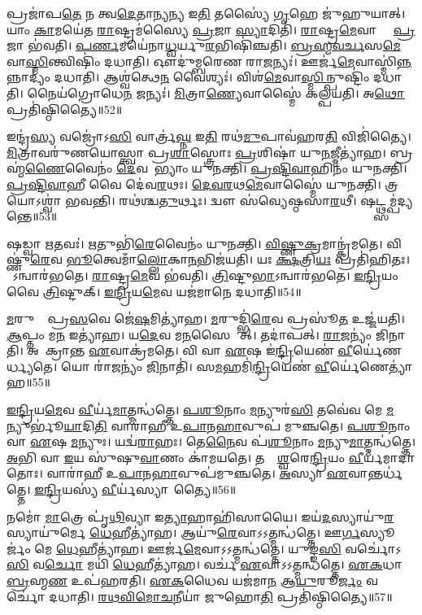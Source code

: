 𑌪𑍍𑌰𑌜𑌾॑𑌪\ul{𑌤𑍇} 𑌨 𑌤𑍍𑌵\ul{𑌦𑍇}𑌤𑌾\ul{𑌨𑍍𑌯}𑌨𑍍𑌯 𑌇\ul{𑌤𑌿} 𑌤𑌸𑍍𑌯𑍈॑ \ul{𑌗𑍃}𑌹𑍇 𑌜𑍁॑𑌹𑍁𑌯𑌾𑌤𑍍।
𑌯𑌾𑌂 \ul{𑌕𑌾}𑌮𑌯𑍇॑𑌤 \ul{𑌰𑌾}𑌷𑍍𑌟𑍍𑌰𑌮॑𑌸𑍍𑌯𑍈 \ul{𑌪𑍍𑌰}𑌜𑌾 \ul{𑌸𑍍𑌯𑌾}𑌦𑌿𑌤𑌿॑।
\ul{𑌰𑌾}𑌷𑍍𑌟𑍍𑌰\ul{𑌮𑍇}𑌵𑌾𑌸𑍍𑌯𑍈᳚ \ul{𑌪𑍍𑌰}𑌜𑌾 𑌭॑𑌵𑌤𑌿।
\ul{𑌪}\ul{𑌰𑍍𑌣}𑌮𑌯𑍇॑𑌨𑌾\ul{𑌧𑍍𑌵}𑌰𑍍𑌯𑍁\ul{𑌰}𑌭𑌿𑌷𑌿॑𑌞𑍍𑌚𑌤𑌿।
\ul{𑌬𑍍𑌰}\ul{𑌹𑍍𑌮}\ul{𑌵}\ul{𑌰𑍍𑌚}𑌸\ul{𑌮𑍇}𑌵𑌾\-\ul{𑌸𑍍𑌮𑌿}𑌨𑍍𑌤𑍍𑌵𑌿𑌷𑌿𑌂॑ 𑌦𑌧𑌾𑌤𑌿।
𑌔𑌦𑍁॑𑌮𑍍𑌬𑌰𑍇𑌣 𑌰𑌾\ul{𑌜}𑌨𑍍𑌯𑌃॑।
𑌊𑌰𑍍𑌜॑\ul{𑌮𑍇}𑌵𑌾\-𑌸𑍍𑌮𑌿॑\ul{𑌨𑍍𑌨}𑌨𑍍𑌨𑌾𑌦𑍍𑌯𑌂॑ 𑌦𑌧𑌾𑌤𑌿।
𑌆𑌶𑍍𑌵॑𑌤𑍍𑌥𑍇\ul{𑌨} 𑌵𑍈𑌶𑍍𑌯𑌃॑।
𑌵𑌿𑌶॑\ul{𑌮𑍇}𑌵𑌾\ul{𑌸𑍍𑌮𑌿}𑌨𑍍𑌪𑍁𑌷𑍍𑌟𑌿𑌂॑ 𑌦𑌧𑌾𑌤𑌿।
𑌨𑍈𑌯॑𑌗𑍍𑌰𑍋𑌧𑍇\ul{𑌨} 𑌜𑌨𑍍𑌯𑌃॑।
\ul{𑌮𑌿}𑌤𑍍𑌰𑌾\ul{𑌣𑍍𑌯𑍇}𑌵𑌾𑌸𑍍𑌮𑍈॑ 𑌕𑌲𑍍𑌪𑌯𑌤𑌿।
𑌅\ul{𑌥𑍋} 𑌪𑍍𑌰𑌤𑌿॑\-𑌷𑍍𑌠𑌿𑌤𑍍𑌯𑍈॥52॥\anuvakamend[\ul{𑌭}\ul{𑌵}\ul{𑌤𑍍𑌯𑌾}\ul{𑌹𑍁𑌃} 𑌪𑍁𑌰𑍁॑\ul{𑌷} 𑌓\ul{𑌜}𑌸𑍇𑌤𑍍𑌯𑌾॑𑌹 \ul{𑌨𑌿}𑌰𑌵॑𑌦𑌯𑌤𑍇 𑌯𑌜\ul{𑌤𑍇} 𑌜\ul{𑌨𑍍𑌯𑍋} 𑌦𑍍𑌵𑍇 𑌚॑]

𑌇𑌨𑍍𑌦𑍍𑌰॑\ul{𑌸𑍍𑌯} 𑌵𑌜𑍍𑌰𑍋॑𑌽\ul{𑌸𑌿} 𑌵𑌾𑌰𑍍𑌤𑍍𑌰॑\ul{𑌘𑍍𑌨} 𑌇\ul{𑌤𑌿} 𑌰𑌥॑\ul{𑌮𑍁}𑌪𑌾𑌵॑𑌹𑌰\ul{𑌤𑌿} 𑌵𑌿𑌜𑌿॑𑌤𑍍𑌯𑍈।
\ul{𑌮𑌿}𑌤𑍍𑌰𑌾𑌵𑌰𑍁॑𑌣𑌯𑍋𑌸𑍍𑌤𑍍𑌵𑌾 𑌪𑍍𑌰\ul{𑌶𑌾}𑌸𑍍𑌤𑍍𑌰𑍋𑌃 \ul{𑌪𑍍𑌰}𑌶𑌿𑌷𑌾॑ 𑌯𑍁\ul{𑌨}𑌜𑍍𑌮𑍀𑌤𑍍𑌯𑌾॑𑌹।
𑌬𑍍𑌰𑌹𑍍𑌮॑\ul{𑌣𑍈}𑌵𑍈𑌨𑌂॑ \ul{𑌦𑍇}𑌵𑌤𑌾᳚𑌭𑍍𑌯𑌾𑌂 𑌯𑍁𑌨𑌕𑍍𑌤𑌿।
\ul{𑌪𑍍𑌰}\ul{𑌷𑍍𑌟𑌿}\ul{𑌵𑌾}𑌹𑌿𑌨𑌂॑ 𑌯𑍁𑌨𑌕𑍍𑌤𑌿।
\ul{𑌪𑍍𑌰}\ul{𑌷𑍍𑌟𑌿}\ul{𑌵𑌾}𑌹𑍀 𑌵𑍈 𑌦𑍇॑𑌵\ul{𑌰}𑌥𑌃।
\ul{𑌦𑍇}\ul{𑌵}\ul{𑌰}𑌥\ul{𑌮𑍇}𑌵𑌾𑌸𑍍𑌮𑍈॑ 𑌯𑍁𑌨𑌕𑍍𑌤𑌿।
𑌤𑍍𑌰𑌯𑍋\-𑌽𑌶𑍍𑌵𑌾॑ 𑌭𑌵𑌨𑍍𑌤𑌿।
𑌰𑌥॑𑌶𑍍𑌚\ul{𑌤𑍁}𑌰𑍍𑌥𑌃।
𑌦𑍍𑌵𑍗 𑌸॑𑌵𑍍𑌯𑍇𑌷𑍍𑌠𑌸𑌾\ul{𑌰}𑌥𑍀।
𑌷𑌟𑍍𑌥𑍍𑌸𑌮𑍍𑌪॑𑌦𑍍𑌯𑌨𑍍𑌤𑍇॥53॥

𑌷𑌡𑍍𑌵𑌾 \ul{𑌋}𑌤𑌵𑌃॑।
\ul{𑌋}𑌤𑍁𑌭𑌿॑\ul{𑌰𑍇}𑌵𑍈𑌨𑌂॑ 𑌯𑍁𑌨𑌕𑍍𑌤𑌿।
\ul{𑌵𑌿}\ul{𑌷𑍍𑌣𑍁}\ul{𑌕𑍍𑌰}𑌮𑌾𑌨𑍍𑌕𑍍𑌰॑𑌮𑌤𑍇।
𑌵𑌿𑌷𑍍𑌣𑍁॑\ul{𑌰𑍇}𑌵 \ul{𑌭𑍂}𑌤𑍍𑌵𑍇𑌮𑌾𑌁\ul{𑌲𑍍𑌲𑍋}𑌕𑌾\ul{𑌨}𑌭𑌿𑌜॑𑌯𑌤𑌿।
𑌯𑌃 \ul{𑌕𑍍𑌷}𑌤𑍍𑌰𑌿\ul{𑌯𑌃} 𑌪𑍍𑌰𑌤𑌿॑\-𑌹𑌿𑌤𑌃।
𑌸𑍋᳚𑌽𑌨𑍍𑌵𑌾𑌰॑𑌭𑌤𑍇।
\ul{𑌰𑌾}𑌷𑍍𑌟𑍍𑌰\ul{𑌮𑍇}𑌵 𑌭॑𑌵𑌤𑌿।
\ul{𑌤𑍍𑌰𑌿}𑌷𑍍𑌟𑍁\ul{𑌭𑌾}\-𑌽𑌨𑍍𑌵𑌾𑌰॑𑌭𑌤𑍇।
\ul{𑌇}\ul{𑌨𑍍𑌦𑍍𑌰𑌿}𑌯𑌂 𑌵𑍈 \ul{𑌤𑍍𑌰𑌿}𑌷𑍍𑌟𑍁𑌕𑍍।
\ul{𑌇}\ul{𑌨𑍍𑌦𑍍𑌰𑌿}𑌯\ul{𑌮𑍇}𑌵 𑌯𑌜॑𑌮𑌾𑌨𑍇 𑌦𑌧𑌾𑌤𑌿॥54॥

\ul{𑌮}𑌰𑍁𑌤𑌾𑌂᳚ 𑌪𑍍𑌰\ul{𑌸}𑌵𑍇 𑌜𑍇॑\ul{𑌷}𑌮𑌿𑌤𑍍𑌯𑌾॑𑌹।
\ul{𑌮}𑌰𑍁𑌦𑍍𑌭𑌿॑\ul{𑌰𑍇}𑌵 𑌪𑍍𑌰𑌸𑍂॑\ul{𑌤} 𑌉𑌜𑍍𑌜॑𑌯𑌤𑌿।
\ul{𑌆}𑌪𑍍𑌤𑌂 𑌮\ul{𑌨} 𑌇𑌤𑍍𑌯𑌾॑𑌹।
𑌯\ul{𑌦𑍇}𑌵 𑌮\ul{𑌨}𑌸𑍈𑌫𑍍𑌸𑍀᳚𑌤𑍍।
𑌤𑌦𑌾॑𑌪𑌤𑍍।
\ul{𑌰𑌾}\ul{𑌜}𑌨𑍍𑌯𑌂॑ 𑌜𑌿𑌨𑌾𑌤𑌿।
𑌅𑌨𑌾᳚𑌕𑍍𑌰𑌾𑌨𑍍𑌤 \ul{𑌏}𑌵𑌾𑌕𑍍𑌰॑𑌮𑌤𑍇।
𑌵𑌿 𑌵𑌾 \ul{𑌏}𑌷 𑌇॑\ul{𑌨𑍍𑌦𑍍𑌰𑌿}𑌯𑍇𑌣॑ \ul{𑌵𑍀}𑌰𑍍𑌯𑍇॑𑌣𑌰𑍍𑌧𑍍𑌯𑌤𑍇।
𑌯𑍋 𑌰𑌾॑\ul{𑌜}𑌨𑍍𑌯𑌂॑ \ul{𑌜𑌿}𑌨𑌾𑌤𑌿॑।
𑌸\ul{𑌮}𑌹𑌮𑌿॑\ul{𑌨𑍍𑌦𑍍𑌰𑌿}𑌯𑍇𑌣॑ \ul{𑌵𑍀}𑌰𑍍𑌯𑍇॑𑌣𑍇𑌤𑍍𑌯𑌾॑𑌹॥55॥

\ul{𑌇}\ul{𑌨𑍍𑌦𑍍𑌰𑌿}𑌯\ul{𑌮𑍇}𑌵 \ul{𑌵𑍀}𑌰𑍍𑌯॑\ul{𑌮𑌾}𑌤𑍍𑌮𑌨𑍍𑌧॑𑌤𑍍𑌤𑍇।
\ul{𑌪}\ul{𑌶𑍂}𑌨𑌾𑌂 \ul{𑌮}𑌨𑍍𑌯𑍁𑌰॑\ul{𑌸𑌿} 𑌤𑌵𑍇॑𑌵 𑌮𑍇 \ul{𑌮}𑌨𑍍𑌯𑍁𑌰𑍍𑌭𑍂॑\ul{𑌯𑌾}𑌦𑌿\ul{𑌤𑌿} 𑌵𑌾𑌰𑌾॑𑌹𑍀 𑌉\ul{𑌪𑌾}𑌨\ul{𑌹𑌾}𑌵𑍁𑌪॑ 𑌮𑍁𑌞𑍍𑌚𑌤𑍇।
\ul{𑌪}\ul{𑌶𑍂}𑌨𑌾𑌂 𑌵𑌾 \ul{𑌏}𑌷 \ul{𑌮}𑌨𑍍𑌯𑍁𑌃।
𑌯𑌦𑍍𑌵॑\ul{𑌰𑌾}𑌹𑌃।
𑌤𑍇\ul{𑌨𑍈}𑌵 𑌪॑\ul{𑌶𑍂}𑌨𑌾𑌂 \ul{𑌮}𑌨𑍍𑌯𑍁\ul{𑌮𑌾}𑌤𑍍𑌮𑌨𑍍𑌧॑𑌤𑍍𑌤𑍇।
\ul{𑌅}𑌭𑌿 𑌵𑌾 \ul{𑌇}𑌯 𑌸𑍁॑𑌷𑍁\ul{𑌵𑌾}𑌣𑌂 𑌕𑌾॑𑌮𑌯𑌤𑍇।
𑌤𑌸𑍍𑌯𑍇᳚\ul{𑌶𑍍𑌵}𑌰𑍇\ul{𑌨𑍍𑌦𑍍𑌰𑌿}𑌯𑌂 \ul{𑌵𑍀}𑌰𑍍𑌯॑𑌮𑌾𑌦𑌾॑𑌤𑍋𑌃।
𑌵𑌾𑌰𑌾॑𑌹𑍀 𑌉\ul{𑌪𑌾}𑌨\ul{𑌹𑌾}𑌵𑍁𑌪॑𑌮𑍁𑌞𑍍𑌚𑌤𑍇।
\ul{𑌅}𑌸𑍍𑌯𑌾 \ul{𑌏}𑌵𑌾𑌨𑍍𑌤𑌰𑍍𑌧॑𑌤𑍍𑌤𑍇।
\ul{𑌇}\ul{𑌨𑍍𑌦𑍍𑌰𑌿}𑌯𑌸𑍍𑌯॑ \ul{𑌵𑍀}𑌰𑍍𑌯॑𑌸𑍍𑌯𑌾𑌨𑌾᳚𑌤𑍍𑌯𑍈॥56॥

𑌨𑌮𑍋॑ \ul{𑌮𑌾}𑌤𑍍𑌰𑍇 𑌪𑍃॑\ul{𑌥𑌿}𑌵𑍍𑌯𑌾 𑌇\ul{𑌤𑍍𑌯𑌾}𑌹𑌾𑌹𑌿॑𑌸𑌾𑌯𑍈।
𑌇𑌯॑\ul{𑌦}𑌸𑍍𑌯𑌾𑌯𑍁॑\ul{𑌰}𑌸𑍍𑌯𑌾𑌯𑍁॑𑌰𑍍𑌮𑍇 \ul{𑌧𑍇}𑌹𑍀𑌤𑍍𑌯𑌾॑𑌹।
𑌆𑌯𑍁॑\ul{𑌰𑍇}𑌵𑌾𑌽𑌽𑌤𑍍𑌮𑌨𑍍𑌧॑𑌤𑍍𑌤𑍇।
𑌊\ul{𑌰𑍍𑌗}𑌸𑍍𑌯𑍂𑌰𑍍𑌜𑌂॑ 𑌮𑍇 \ul{𑌧𑍇}𑌹𑍀𑌤𑍍𑌯𑌾॑𑌹।
𑌊𑌰𑍍𑌜॑\ul{𑌮𑍇}𑌵𑌾𑌽𑌽𑌤𑍍𑌮𑌨𑍍𑌧॑𑌤𑍍𑌤𑍇।
𑌯𑍁𑌙𑍍𑌙॑\ul{𑌸𑌿} 𑌵𑌰𑍍𑌚𑍋॑𑌽\ul{𑌸𑌿} 𑌵\ul{𑌰𑍍𑌚𑍋} 𑌮𑌯𑌿॑ \ul{𑌧𑍇}𑌹𑍀𑌤𑍍𑌯𑌾॑𑌹।
𑌵𑌰𑍍𑌚॑ \ul{𑌏}𑌵𑌾𑌽𑌽𑌤𑍍𑌮𑌨𑍍𑌧॑𑌤𑍍𑌤𑍇।
\ul{𑌏}\ul{𑌕}𑌧𑌾 \ul{𑌬𑍍𑌰}𑌹𑍍𑌮\ul{𑌣} 𑌉𑌪॑𑌹𑌰𑌤𑌿।
\ul{𑌏}\ul{𑌕}𑌧𑍈𑌵 𑌯𑌜॑𑌮𑌾\ul{𑌨} 𑌆\ul{𑌯𑍁}𑌰𑍂\ul{𑌰𑍍𑌜𑌂} 𑌵𑌰𑍍𑌚𑍋॑ 𑌦𑌧𑌾𑌤𑌿।
\ul{𑌰}\ul{𑌥}\ul{𑌵𑌿}\ul{𑌮𑍋}\ul{𑌚}𑌨𑍀𑌯𑌾॑ 𑌜𑍁𑌹𑍋\ul{𑌤𑌿} 𑌪𑍍𑌰𑌤𑌿॑\-𑌷𑍍𑌠𑌿𑌤𑍍𑌯𑍈॥57॥

